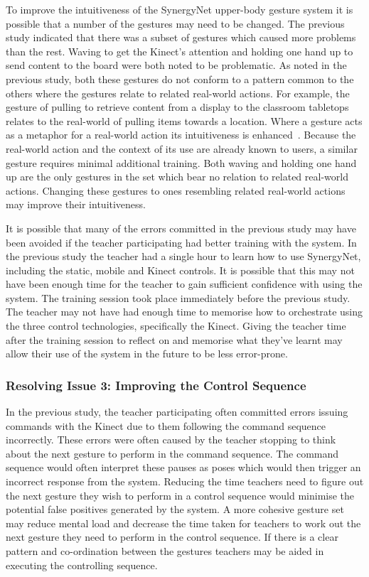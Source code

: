 \documentclass[link]{IWCOMP}
\begin{document}
To improve the intuitiveness of the SynergyNet upper-body gesture system it is possible that a number of the gestures may need to be changed.
The previous study indicated that there was a subset of gestures which caused more problems than the rest.
Waving to get the Kinect's attention and holding one hand up to send content to the board were both noted to be problematic.
As noted in the previous study, both these gestures do not conform to a pattern common to the others where the gestures relate to related real-world actions.
For example, the gesture of pulling to retrieve content from a display to the classroom tabletops relates to the real-world of pulling items towards a location.
Where a gesture acts as a metaphor for a real-world action its intuitiveness is enhanced~\cite{Wang2008}.
Because the real-world action and the context of its use are already known to users, a similar gesture requires minimal additional training.
Both waving and holding one hand up are the only gestures in the set which bear no relation to related real-world actions.
Changing these gestures to ones resembling related real-world actions may improve their intuitiveness.

It is possible that many of the errors committed in the previous study may have been avoided if the teacher participating had better training with the system.
In the previous study the teacher had a single hour to learn how to use SynergyNet, including the static, mobile and Kinect controls.
It is possible that this may not have been enough time for the teacher to gain sufficient confidence with using the system.
The training session took place immediately before the previous study.
The teacher may not have had enough time to memorise how to orchestrate using the three control technologies, specifically the Kinect.
Giving the teacher time after the training session to reflect on and memorise what they've learnt may allow their use of the system in the future to be less error-prone.

\subsubsection{Resolving Issue 3: Improving the Control Sequence}
\label{subsubsec:studyPhase2ResolvingIssues3}

In the previous study, the teacher participating often committed errors issuing commands with the Kinect due to them following the command sequence incorrectly.
These errors were often caused by the teacher stopping to think about the next gesture to perform in the command sequence.
The command sequence would often interpret these pauses as poses which would then trigger an incorrect response from the system.
Reducing the time teachers need to figure out the next gesture they wish to perform in a control sequence would minimise the potential false positives generated by the system.
A more cohesive gesture set may reduce mental load and decrease the time taken for teachers to work out the next gesture they need to perform in the control sequence.
If there is a clear pattern and co-ordination between the gestures teachers may be aided in executing the controlling sequence.
\end{document}
